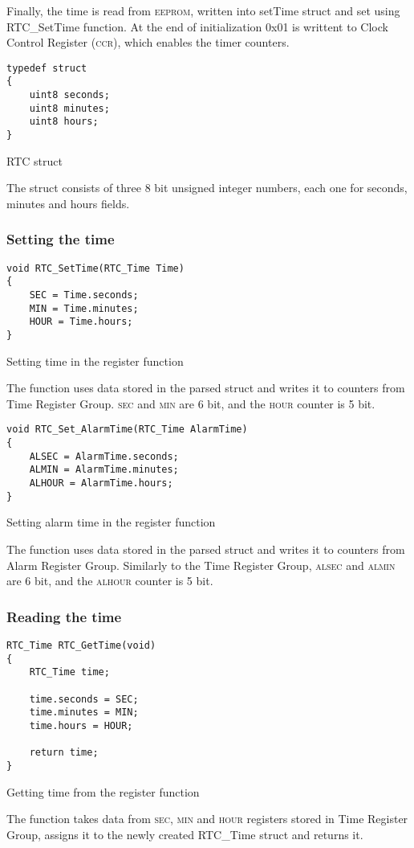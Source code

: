 \documentclass[10pt]{article}
\begin{document}
Finally, the time is read from \textsc{eeprom}, written into setTime struct and set using RTC\_SetTime function. At the end of initialization 0x01 is writtent to Clock Control Register (\textsc{ccr}), which enables the timer counters.

\begin{program}[H]
	\begin{lstlisting}
typedef struct
{
	uint8 seconds;
	uint8 minutes;
	uint8 hours;
} 
	\end{lstlisting}
	\caption{RTC struct}
\end{program}
The struct consists of three 8 bit unsigned integer numbers, each one for seconds, minutes and hours fields.

\subsubsection{Setting the time}
\begin{program}[H]
	\begin{lstlisting}
void RTC_SetTime(RTC_Time Time)
{
	SEC = Time.seconds;
	MIN = Time.minutes;
	HOUR = Time.hours;
}
	\end{lstlisting}
	\caption{Setting time in the register function}
\end{program}
The function uses data stored in the parsed struct and writes it to counters from Time Register Group. \textsc{sec} and \textsc{min} are 6 bit, and the \textsc{hour} counter is 5 bit.

\begin{program}[H]
	\begin{lstlisting}
void RTC_Set_AlarmTime(RTC_Time AlarmTime)
{
	ALSEC = AlarmTime.seconds;
	ALMIN = AlarmTime.minutes;
	ALHOUR = AlarmTime.hours;
}
	\end{lstlisting}
	\caption{Setting alarm time in the register function}
\end{program}
The function uses data stored in the parsed struct and writes it to counters from Alarm Register Group. Similarly to the Time Register Group, \textsc{alsec} and \textsc{almin} are 6 bit, and the \textsc{alhour} counter is 5 bit.

\subsubsection{Reading the time}
\begin{program}[H]
	\begin{lstlisting}
RTC_Time RTC_GetTime(void)
{
	RTC_Time time;

	time.seconds = SEC;
	time.minutes = MIN;
	time.hours = HOUR;

	return time;
}
	\end{lstlisting}
	\caption{Getting time from the register function}
\end{program}
The function takes data from \textsc{sec}, \textsc{min} and \textsc{hour} registers stored in Time Register Group, assigns it to the newly created RTC\_Time struct and returns it.
\end{document}
